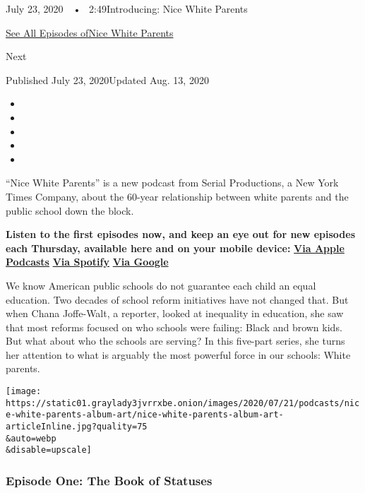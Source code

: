 July 23, 2020~~•~ 2:49Introducing: Nice White Parents

\href{https://www.nytimes3xbfgragh.onion/column/nice-white-parents}{See
All Episodes ofNice White Parents}

Next

Published July 23, 2020Updated Aug. 13, 2020

\begin{itemize}
\item
\item
\item
\item
\item
\end{itemize}

``Nice White Parents'' is a new podcast from Serial Productions, a New
York Times Company, about the 60-year relationship between white parents
and the public school down the block.

\textbf{Listen to the first episodes now, and keep an eye out for new
episodes each Thursday, available here and on your mobile device:}
\textbf{\href{https://podcasts.apple.com/us/podcast/nice-white-parents/id1524080195}{Via
Apple Podcasts}} \textbf{\textbar{}}
\textbf{\href{https://open.spotify.com/show/7oBSLCZFCgpdCaBjIG8mLV?si=YcEPLD3xT2ejXmpQz-tRpw}{Via
Spotify}} \textbf{\textbar{}}
\textbf{\href{https://podcasts.google.com/feed/aHR0cHM6Ly9yc3MuYXJ0MTkuY29tL25pY2Utd2hpdGUtcGFyZW50cw}{Via
Google}}

We know American public schools do not guarantee each child an equal
education. Two decades of school reform initiatives have not changed
that. But when Chana Joffe-Walt, a reporter, looked at inequality in
education, she saw that most reforms focused on who schools were
failing: Black and brown kids. But what about who the schools are
serving? In this five-part series, she turns her attention to what is
arguably the most powerful force in our schools: White parents.

\texttt{[image: https://static01.graylady3jvrrxbe.onion/images/2020/07/21/podcasts/nice-white-parents-album-art/nice-white-parents-album-art-articleInline.jpg?quality=75\\\&auto=webp\\\&disable=upscale]}

\hypertarget{episode-one-the-book-of-statuses}{%
\subsubsection{Episode One: The Book of
Statuses}\label{episode-one-the-book-of-statuses}}

